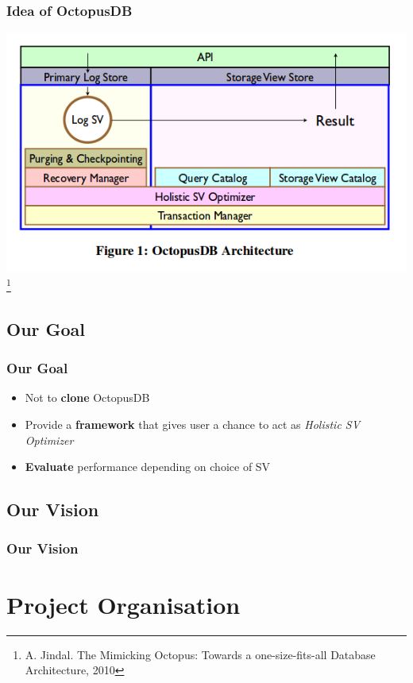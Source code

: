 \documentclass{beamer}
\begin{document}
\begin{frame}
\frametitle{Idea of OctopusDB}
\includegraphics[scale=0.5]{img/octopus_arch.png}
\footnote{A. Jindal. The Mimicking Octopus: Towards a one-size-fits-all Database Architecture, 2010}
\end{frame}

\subsection{Our Goal}
\begin{frame}
\frametitle{Our Goal}
\begin{itemize}
\item{Not to \textbf{clone} OctopusDB} \pause
\item{Provide a \textbf{framework} that gives user a chance to act as \textit{Holistic SV Optimizer}} \pause
\item{\textbf{Evaluate} performance depending on choice of SV}
\end{itemize}
\end{frame}

\subsection{Our Vision}
\begin{frame}
\frametitle{Our Vision}
\end{frame}

\section{Project Organisation}
\end{document}
